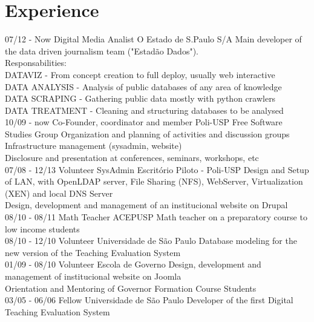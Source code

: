 \documentclass[]{friggeri-cv}
\begin{document}
\section{Experience}
\begin{entrylist}
  \entry
    {07/12 - Now}
    {Digital Media Analist}
    {O Estado de S.Paulo S/A}
    {Main developer of the data driven journalism team ("Estadão Dados").\\
     Responsabilities:\\
     DATAVIZ - From concept creation to full deploy, usually web interactive\\
     DATA ANALYSIS - Analysis of public databases of any area of knowledge\\
     DATA SCRAPING - Gathering public data mostly with python crawlers\\
     DATA TREATMENT - Cleaning and structuring databases to be analysed\\}
  \entry
    {10/09 - now}
    {Co-Founder, coordinator and member}
    {Poli-USP Free Software Studies Group}
    {Organization and planning of activities and discussion groups\\
     Infrastructure management (sysadmin, website)\\
     Disclosure and presentation at conferences, seminars, workshops, etc\\}
   \entry
    {07/08 - 12/13}
    {Volunteer SysAdmin}
    {Escritório Piloto - Poli-USP}
    {Design and Setup of LAN, with OpenLDAP server, File Sharing (NFS), WebServer, Virtualization (XEN) and local DNS Server\\
     Design, development and management of an institucional website on Drupal\\}
   \entry
    {08/10 - 08/11}
    {Math Teacher}
    {ACEPUSP}
    {Math teacher on a preparatory course to low income students\\}
   \entry
    {08/10 - 12/10}
    {Volunteer}
    {Universidade de São Paulo}
    {Database modeling for the new version of the Teaching Evaluation System\\}
   \entry
    {01/09 - 08/10}
    {Volunteer}
    {Escola de Governo}
    {Design, development and management of institucional website on Joomla\\
     Orientation and Mentoring of Governor Formation Course Students\\}
   \entry
    {03/05 - 06/06}
    {Fellow}
    {Universidade de São Paulo}
    {Developer of the first Digital Teaching Evaluation System}
\end{entrylist}
\end{document}
